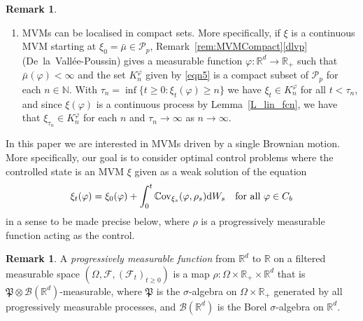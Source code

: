 \documentclass{article}
\theoremstyle{definition}
\newtheorem{remark}[theorem]{\textbf{Remark}}
\numberwithin{equation}{section}
\numberwithin{theorem}{section}
\newcommand{\R}{\mathbb{R}}
\newcommand{\Cov}{\mathbb{C}\mathrm{ov}}
\renewcommand{\d}{{\rm d}}
\newcommand{\N}{{\mathbb N}}
\newcommand{\Bcal}{{\mathcal B}}
\newcommand{\Fcal}{{\mathcal F}}
\newcommand{\Pcal}{{\mathcal P}}
\begin{document}
\begin{remark}
\begin{enumerate}
\item\label{page:mvm_localise_compact} MVMs can be localised in compact sets. More specifically, if $\xi$ is a continuous MVM starting at $\xi_0=\bar\mu\in\Pcal_p$, 
Remark~\ref{rem:MVMCompact}\ref{dlvp} (De~la~Vall\'ee-Poussin)
 gives a  measurable function $\varphi:\R^d\to\R_+$ such that $\bar\mu(\varphi) < \infty$ and the set
$
K^\varphi_n 
$
given by \eqref{eqn5} is a compact subset of $\Pcal_p$ for each $n\in \N$. With $\tau_n=\inf\{t\ge0\colon\xi_t(\varphi)\ge n\}$ we have $\xi_t\in K_n^\varphi$ for all $t<\tau_n$, and since $\xi(\varphi)$ is a continuous process by Lemma~\ref{L_lin_fcn}, we have that $\xi_{\tau_n}\in K_n^\varphi$ for each $n$ and $\tau_n\to\infty$ as $n\to\infty$.
\end{enumerate}
\end{remark}


In this paper we are interested in MVMs driven by a single Brownian motion. More specifically, our goal is to consider optimal control problems where the controlled state is an MVM $\xi$ given as a weak solution of the equation
\begin{equation}\label{eq_MVM_SDE}
\xi_t(\varphi) = \xi_0(\varphi) + \int_0^t \Cov_{\xi_s}(\varphi,\rho_s) \d W_s \quad \text{for all } \varphi \in C_b
\end{equation}
in a sense to be made precise below, where $\rho$ is a progressively measurable function acting as the control.

\begin{remark} \label{R_prog_meas_fcn}
A \emph{progressively measurable function} from $\R^d$ to $\R$ on a filtered measurable space $(\Omega, \Fcal, (\Fcal_t)_{t \ge 0})$ is a map $\rho \colon \Omega \times \R_+ \times \R^d$ that is $\mathfrak P \otimes \Bcal(\R^d)$-measurable, where $\mathfrak P$ is the $\sigma$-algebra on $\Omega\times\R_+$ generated by all progressively measurable processes, and $\Bcal(\R^d)$ is the Borel $\sigma$-algebra on $\R^d$.
\end{remark}
\end{document}
